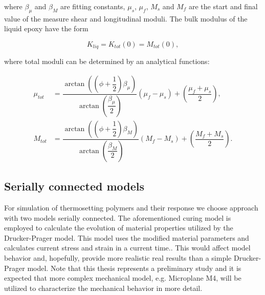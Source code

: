  where $\beta_\mu$ and $\beta_M$ are fitting constants, $\mu_s$, $\mu_f$, $M_s$ and $M_f$ are the start and final value of the measure shear and longitudinal moduli. The bulk modulus of the liquid epoxy have the form
 
 \begin{equation}
 	K_{liq} = K_{tot}(0) = M_{tot}(0),
 \end{equation} 
 
 where total moduli can be determined by an analytical functions:
 
 \begin{align}
 	\mu_{tot} &= \dfrac{\arctan((\phi+\dfrac{1}{2})\beta_\mu)}{\arctan(\dfrac{\beta_\mu}{2})}(\mu_f-\mu_s)+\left( \dfrac{\mu_f + \mu_s}{2} \right),\\
 	M_{tot} &= \dfrac{\arctan((\phi+\dfrac{1}{2})\beta_M)}{\arctan(\dfrac{\beta_M}{2})}(M_f-M_s)+\left( \dfrac{M_f + M_s}{2} \right).
 \end{align}
 
 \subsection{Serially connected models}
 \indent
 
 For simulation of thermosetting polymers and their response we choose approach with two models serially connected. The aforementioned curing model is employed to calculate the evolution of material properties utilized by the Drucker-Prager model. This model uses the modified material parameters and calculates current stress and strain in a current time.. This would affect model behavior and, hopefully, provide more realistic real results than a simple Drucker-Prager model. Note that this thesis represents a preliminary study and it is expected that more complex mechanical model, e.g. Microplane M4, will be utilized to characterize the mechanical behavior in more detail. 
